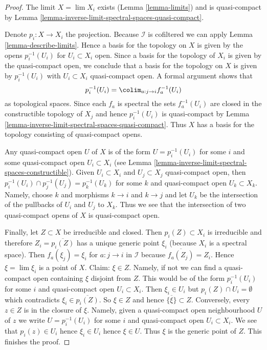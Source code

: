 \begin{proof}
The limit $X = \lim X_i$ exists (Lemma \ref{lemma-limits})
and is quasi-compact by
Lemma \ref{lemma-inverse-limit-spectral-spaces-quasi-compact}.

\medskip\noindent
Denote $p_i : X \to X_i$ the projection.
Because $\mathcal{I}$ is cofiltered we can apply
Lemma \ref{lemma-describe-limits}.
Hence a basis for the topology on $X$ is given by the opens
$p_i^{-1}(U_i)$ for $U_i \subset X_i$ open. Since a basis for
the topology of $X_i$ is given by the quasi-compact open, we conclude
that a basis for the topology on $X$ is given by $p_i^{-1}(U_i)$
with $U_i \subset X_i$ quasi-compact open. A formal argument
shows that
$$
p_i^{-1}(U_i) = \colim_{a : j \to i} f_a^{-1}(U_i)
$$
as topological spaces. Since each $f_a$ is spectral the sets
$f_a^{-1}(U_i)$ are closed in the constructible topology of $X_j$
and hence $p_i^{-1}(U_i)$ is quasi-compact
by Lemma \ref{lemma-inverse-limit-spectral-spaces-quasi-compact}.
Thus $X$ has a basis for the topology consisting of quasi-compact opens.

\medskip\noindent
Any quasi-compact open $U$ of $X$ is of the form $U = p_i^{-1}(U_i)$
for some $i$ and some quasi-compact open $U_i \subset X_i$
(see Lemma \ref{lemma-inverse-limit-spectral-spaces-constructible}).
Given $U_i \subset X_i$ and $U_j \subset X_j$ quasi-compact open, then
$p_i^{-1}(U_i) \cap p_j^{-1}(U_j) = p_k^{-1}(U_k)$ for some $k$
and quasi-compact open $U_k \subset X_k$. Namely, choose $k$
and morphisms $k \to i$ and $k \to j$ and let $U_k$ be the intersection of the
pullbacks of $U_i$ and $U_j$ to $X_k$. Thus we see that the intersection
of two quasi-compact opens of $X$ is quasi-compact open.

\medskip\noindent
Finally, let $Z \subset X$ be irreducible and closed. Then $p_i(Z) \subset X_i$
is irreducible and therefore $Z_i = \overline{p_i(Z)}$ has a unique generic
point $\xi_i$ (because $X_i$ is a spectral space). Then $f_a(\xi_j) = \xi_i$
for $a : j \to i$ in $\mathcal{I}$ because $\overline{f_a(Z_j)} = Z_i$.
Hence $\xi = \lim \xi_i$ is a point of $X$. Claim: $\xi \in Z$. Namely,
if not we can find a quasi-compact open containing $\xi$ disjoint
from $Z$. This would be of the form $p_i^{-1}(U_i)$ for some $i$ and
quasi-compact open $U_i \subset X_i$. Then $\xi_i \in U_i$ but
$p_i(Z) \cap U_i = \emptyset$ which contradicts $\xi_i \in \overline{p_i(Z)}$.
So $\xi \in Z$ and hence $\overline{\{\xi\}} \subset Z$. Conversely,
every $z \in Z$ is in the closure of $\xi$. Namely, given a quasi-compact
open neighbourhood $U$ of $z$ we write $U = p_i^{-1}(U_i)$ for some $i$
and quasi-compact open $U_i \subset X_i$. We see that $p_i(z) \in U_i$
hence $\xi_i \in U_i$ hence $\xi \in U$. Thus $\xi$ is the generic point
of $Z$. This finishes the proof.
\end{proof}

